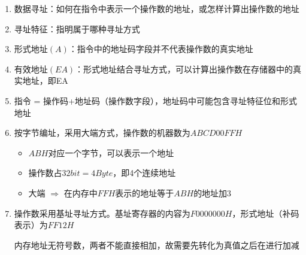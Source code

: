 \documentclass[./computer-organization-and-architecture.tex]{subfiles}
\begin{document}
    \begin{enumerate}
        \item 数据寻址：如何在指令中表示一个操作数的地址，或怎样计算出操作数的地址
        \item 寻址特征：指明属于哪种寻址方式
        \item 形式地址$(A)$：指令中的地址码字段并不代表操作数的真实地址
        \item 有效地址$(EA)$：形式地址结合寻址方式，可以计算出操作数在存储器中的真实地址，即EA
        \item 指令 = 操作码+地址码（操作数字段），地址码中可能包含寻址特征位和形式地址
        \item 按字节编址，采用大端方式，操作数的机器数为$ABCD 00FFH$
        \begin{itemize}
            \item $ABH$对应一个字节，可以表示一个地址
            \item 操作数占$32bit = 4Byte$，即4个连续地址
            \item 大端 $\Rightarrow$ 在内存中$FFH$表示的地址等于$ABH$的地址加3
        \end{itemize}
        \item {\color{red}{内存地址是无符号数}}
        \begin{analysisbox}
            操作数采用基址寻址方式。基址寄存器的内容为$F000 0000H$，形式地址（补码表示）为$FF12H$

            内存地址无符号数，两者不能直接相加，故需要先转化为真值之后在进行加减
        \end{analysisbox}
    \end{enumerate}
\end{document}
